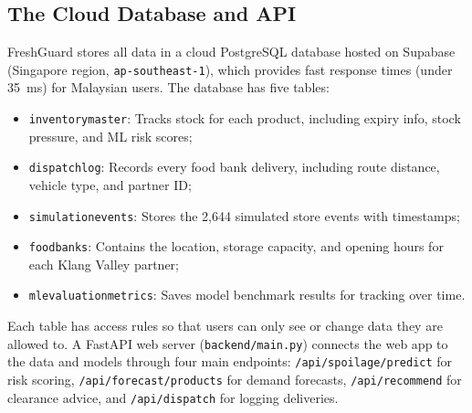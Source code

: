 \documentclass[12pt,a4paper]{article}
\renewcommand{\_}{\oldunderscore\allowbreak}
\begin{document}
\subsection{The Cloud Database and API}
FreshGuard stores all data in a cloud PostgreSQL database hosted on Supabase (Singapore region, \texttt{ap-southeast-1}), which provides fast response times (under 35~ms) for Malaysian users. The database has five tables:
\begin{itemize}[leftmargin=18pt, itemsep=2pt]
    \item \texttt{inventory\_master}: Tracks stock for each product, including expiry info, stock pressure, and ML risk scores;
    \item \texttt{dispatch\_log}: Records every food bank delivery, including route distance, vehicle type, and partner ID;
    \item \texttt{simulation\_events}: Stores the 2,644 simulated store events with timestamps;
    \item \texttt{food\_banks}: Contains the location, storage capacity, and opening hours for each Klang Valley partner;
    \item \texttt{ml\_evaluation\_metrics}: Saves model benchmark results for tracking over time.
\end{itemize}
Each table has access rules so that users can only see or change data they are allowed to. A FastAPI web server (\texttt{backend/main.py}) connects the web app to the data and models through four main endpoints: \texttt{/api/spoilage/predict} for risk scoring, \texttt{/api/forecast/products} for demand forecasts, \texttt{/api/recommend} for clearance advice, and \texttt{/api/dispatch} for logging deliveries.
\end{document}
